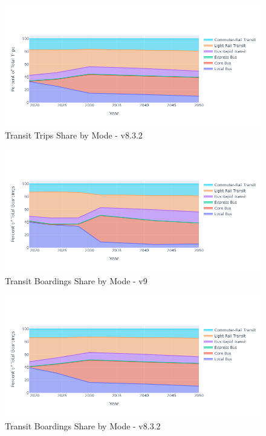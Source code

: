 \documentclass[
  letterpaper,
  DIV=11,
  numbers=noendperiod]{scrreprt}
\begin{document}
\begin{figure}[H]

{\centering \includegraphics{v9x/v900/whats-new/_pictures/pdf-shr-tr-all-832.png}

}

\caption{\label{fig-pdf-shr-tr-all-832}Transit Trips Share by Mode -
v8.3.2}

\end{figure}

\begin{figure}[H]

{\centering \includegraphics{v9x/v900/whats-new/_pictures/pdf-brd-9.png}

}

\caption{\label{fig-pdf-brd-9}Transit Boardings Share by Mode - v9}

\end{figure}

\begin{figure}[H]

{\centering \includegraphics{v9x/v900/whats-new/_pictures/pdf-brd-832.png}

}

\caption{\label{fig-pdf-brd-832}Transit Boardings Share by Mode -
v8.3.2}

\end{figure}
\end{document}
